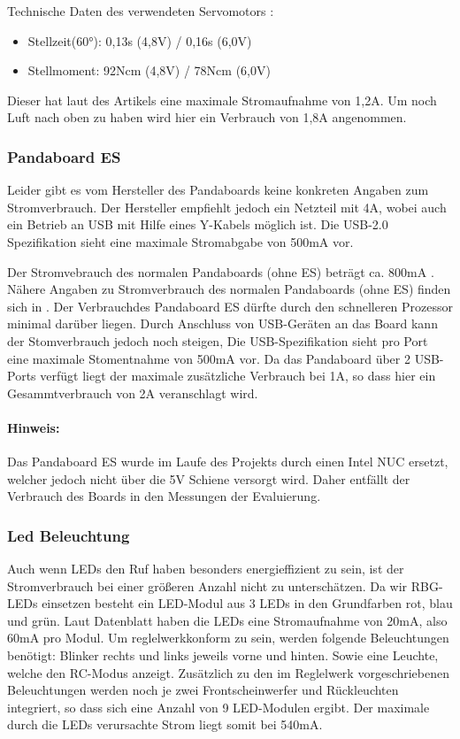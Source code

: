 Technische Daten des verwendeten Servomotors \cite{website-servo-dat}:
\begin{itemize}
 \item Stellzeit(60°): 0,13s (4,8V) / 0,16s (6,0V)
 \item Stellmoment: 92Ncm (4,8V) / 78Ncm (6,0V)
\end{itemize}



Dieser hat laut des Artikels eine maximale Stromaufnahme von 1,2A. Um noch Luft nach oben zu haben wird hier ein Verbrauch von 
1,8A angenommen.

\subsubsection{Pandaboard ES}
Leider gibt es vom Hersteller des Pandaboards keine konkreten Angaben zum Stromverbrauch. Der Hersteller empfiehlt jedoch ein
Netzteil mit 4A\cite{website-panda-supply}, wobei auch ein Betrieb an USB mit Hilfe eines Y-Kabels möglich ist. Die USB-2.0 Spezifikation\cite{website-usb-spec} sieht eine maximale 
Stromabgabe von 500mA vor.

Der Stromvebrauch des normalen Pandaboards (ohne ES) beträgt ca. 800mA \cite{website-panda-power}.
Nähere Angaben zu Stromverbrauch des normalen Pandaboards (ohne ES) finden sich in \cite{website-panda-power}.
Der Verbrauchdes Pandaboard ES dürfte durch den schnelleren Prozessor minimal darüber liegen. 
Durch Anschluss von USB-Geräten an das Board kann der Stomverbrauch jedoch noch steigen, Die USB-Spezifikation \cite{website-usb-spec}
sieht pro Port eine maximale Stomentnahme von 500mA vor. Da das Pandaboard über 2 USB-Ports verfügt liegt der maximale zusätzliche Verbrauch bei 1A,
so dass hier ein Gesammtverbrauch von 2A veranschlagt wird.

\paragraph{Hinweis:}
Das Pandaboard ES wurde im Laufe des Projekts durch einen Intel NUC ersetzt, welcher jedoch nicht über die 5V Schiene versorgt wird.
Daher entfällt der Verbrauch des Boards in den Messungen der Evaluierung.

\subsubsection{Led Beleuchtung}
Auch wenn LEDs den Ruf haben besonders energieffizient zu sein, ist der Stromverbrauch bei einer größeren Anzahl nicht zu
unterschätzen. Da wir RBG-LEDs einsetzen besteht ein LED-Modul aus 3 LEDs in den Grundfarben rot, blau und grün.
Laut Datenblatt \cite{ds-WS2812} haben die LEDs eine Stromaufnahme von 20mA, also 60mA pro Modul.
Um reglelwerkkonform zu sein, werden folgende Beleuchtungen benötigt: Blinker rechts und links jeweils vorne und hinten.
Sowie eine Leuchte, welche den RC-Modus anzeigt. Zusätzlich zu den im Reglelwerk vorgeschriebenen Beleuchtungen werden noch je
zwei Frontscheinwerfer und Rückleuchten integriert, so dass sich eine Anzahl von 9 LED-Modulen ergibt.
Der maximale durch die LEDs verursachte Strom liegt somit bei 540mA. 


